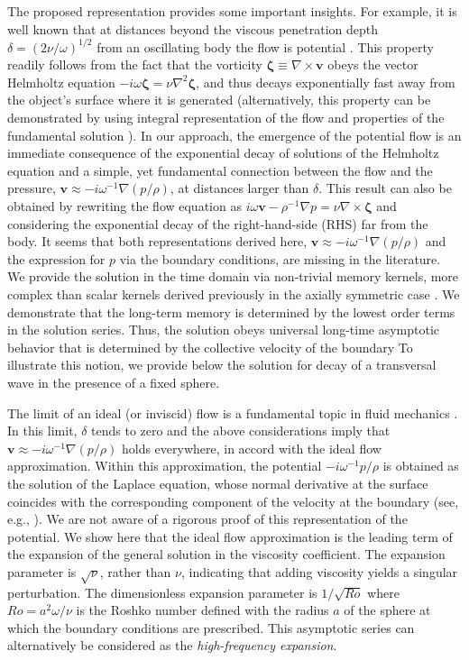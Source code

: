 \documentclass[aps,prx,twocolumn,amsmath,amssymb,amsfonts]{revtex4-2}
\newcommand{\red}[1]{{\color{red}#1}}
\begin{document}
The proposed representation provides some important insights. For example, it is well known that at distances beyond the viscous penetration depth $\delta=(2\nu/\omega)^{1/2}$ from an oscillating body the flow is potential \cite{LL}. This property readily follows from the fact that the vorticity $\bm \zeta\equiv \nabla\times \bm v$ obeys the vector Helmholtz equation $-i\omega \bm \zeta=\nu\nabla^2\bm \zeta$, and thus decays exponentially fast away from the object's surface where it is generated (alternatively, this property can be demonstrated by using integral representation of the flow and properties of the fundamental solution \cite{fl18}). In our approach, the emergence of the potential flow is an immediate consequence of the exponential decay of solutions of the Helmholtz equation and a simple, yet fundamental connection between the flow and the pressure, $\bm v\approx -i\omega^{-1} \nabla (p/\rho)$, at distances larger than $\delta$. This result can also be obtained by rewriting the flow equation as $i\omega \bm v-\rho^{-1} \nabla p=\nu\nabla\times \bm \zeta$ and considering the exponential decay of the right-hand-side (RHS) far from the body. It seems that both representations derived here, $\bm v\approx -i\omega^{-1} \nabla (p/\rho)$  and the expression for $p$ via the boundary conditions, are missing in the literature. We provide the solution in the time domain via non-trivial memory kernels, more complex than scalar kernels derived previously in the axially symmetric case \cite{Ishimoto}. We demonstrate that the long-term memory is determined by the lowest order terms in the solution series. Thus, the solution obeys universal long-time asymptotic behavior that is determined by the collective velocity of the boundary %
To illustrate this notion, we provide below the solution for decay of a transversal wave in the presence of a fixed sphere.

The limit of an ideal (or inviscid) flow is a fundamental topic in fluid mechanics \cite{LL,bat}. In this limit, $\delta$ tends to zero and the above considerations imply that $\bm v\approx -i\omega^{-1} \nabla (p/\rho)$ holds everywhere, in accord with the ideal flow approximation. Within this approximation, the potential $ -i\omega^{-1}p/\rho$ is obtained as the solution of the Laplace equation, whose normal derivative at the surface coincides with the corresponding component of the velocity at the boundary (see, e.g., \cite{simha,fl18}). We are not aware of a rigorous proof of this representation of the potential. We show here that the ideal flow approximation is the leading term of the expansion of the general solution in the viscosity coefficient.  The expansion parameter is $\sqrt{\nu}$, rather than $\nu$, indicating that adding viscosity yields a singular perturbation. The dimensionless expansion parameter is $1/\sqrt{Ro}$ where $Ro\!=\!a^2\omega/\nu$ is the Roshko number defined with the radius $a$ of the sphere at which the boundary conditions are prescribed. This asymptotic series can alternatively be considered as the \emph{high-frequency expansion}.
\end{document}

